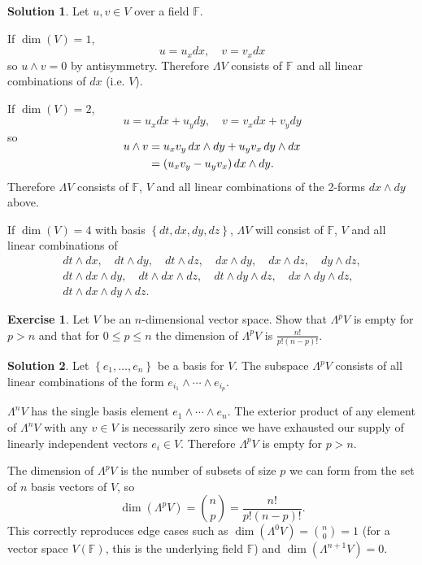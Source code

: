 \documentclass[11pt, a4paper]{report}
\theoremstyle{definition}
\newtheorem{ex}{Exercise}[part]
\newtheorem{sol}{Solution}[part]
\begin{document}
\begin{sol}

Let $u, v \in V$ over a field $\mathbb{F}$.

If $\dim(V) = 1$,
\[
    u = u_x dx, \quad v = v_x dx
\]
so $u \wedge v = 0$ by antisymmetry. Therefore $\Lambda V$ consists of $\mathbb{F}$ and all linear combinations of $dx$ (i.e. $V$).

If $\dim(V) = 2$,
\[
    u = u_x dx + u_y dy, \quad v = v_x dx + v_y dy
\]
so
\begin{align*}
    \SwapAboveDisplaySkip
    u \wedge v &= u_x v_y \, dx \wedge dy + u_y v_x \, dy \wedge dx \\
               &= (u_x v_y - u_y v_x) \, dx \wedge dy.
\end{align*}
Therefore $\Lambda V$ consists of $\mathbb{F}$, $V$ and all linear combinations of the 2-forms $dx \wedge dy$ above.

If $\dim(V) = 4$ with basis $\left\{dt, dx, dy, dz\right\}$, $\Lambda V$ will consist of $\mathbb{F}$, $V$ and all linear combinations of
\begin{gather*}
    dt \wedge dx, \quad
    dt \wedge dy, \quad
    dt \wedge dz, \quad
    dx \wedge dy, \quad
    dx \wedge dz, \quad
    dy \wedge dz, \\
    dt \wedge dx \wedge dy, \quad
    dt \wedge dx \wedge dz, \quad
    dt \wedge dy \wedge dz, \quad
    dx \wedge dy \wedge dz, \\
    dt \wedge dx \wedge dy \wedge dz.
\end{gather*}

\end{sol}

\begin{ex}

Let $V$ be an $n$-dimensional vector space. Show that $\Lambda^p V$ is empty for $p > n$ and that for $0 \leq p \leq n$ the dimension of $\Lambda^p V$ is $\frac{n!}{p! (n - p)!}$.

\end{ex}

\begin{sol}

Let $\left\{e_1, \ldots, e_n\right\}$ be a basis for $V$.
The subspace $\Lambda^p V$ consists of all linear combinations of the form $e_{i_1} \wedge \cdots \wedge e_{i_p}$.

$\Lambda^n V$ has the single basis element $e_1 \wedge \cdots \wedge e_n$.
The exterior product of any element of $\Lambda^n V$ with any $v \in V$ is necessarily zero since we have exhausted our supply of linearly independent vectors $e_i \in V$. Therefore $\Lambda^p V$ is empty for $p > n$.

The dimension of $\Lambda^p V$ is the number of subsets of size $p$ we can form from the set of $n$ basis vectors of $V$, so
\[
    \dim(\Lambda^p V) = \binom{n}{p} = \frac{n!}{p! (n - p)!}.
\]
This correctly reproduces edge cases such as $\dim(\Lambda^0 V) = \binom{n}{0} = 1$ (for a vector space $V(\mathbb{F})$, this is the underlying field $\mathbb{F}$) and $\dim(\Lambda^{n+1}V) = 0$.

\end{sol}
\end{document}
